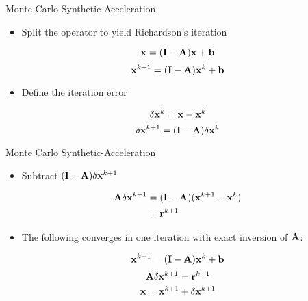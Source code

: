 \documentclass{beamer}
\begin{document}
\begin{frame}{Monte Carlo Synthetic-Acceleration}
  \begin{itemize}
  \item Split the operator to yield Richardson's iteration
  \end{itemize}

  \[
  \mathbf{x} = (\mathbf{I} - \mathbf{A})\mathbf{x} + \mathbf{b}
  \]
  \[
  \mathbf{x}^{k+1} = (\mathbf{I} - \mathbf{A})\mathbf{x}^k + \mathbf{b}
  \]

  \begin{itemize}
  \item Define the iteration error
  \end{itemize}

  \[
  \delta \mathbf{x}^k = \mathbf{x} - \mathbf{x}^k
  \]
  \[
  \delta \mathbf{x}^{k+1} = (\mathbf{I} - \mathbf{A})\delta \mathbf{x}^k
  \]

\end{frame}

\begin{frame}{Monte Carlo Synthetic-Acceleration}

  \begin{itemize}
  \item Subtract $(\mathbf{I} - \mathbf{A})\delta \mathbf{x}^{k+1}$
  \end{itemize}

  \[
  \begin{split}
    \mathbf{A}\delta \mathbf{x}^{k+1} &= (\mathbf{I} -
    \mathbf{A})(\mathbf{x}^{k+1}-\mathbf{x}^{k}) \\ &= \mathbf{r}^{k+1}
  \end{split}
  \]

  \begin{itemize}
  \item The following converges in one iteration with exact inversion
    of $\mathbf{A}$:
  \end{itemize}

  \[
  \mathbf{x}^{k+1} = (\mathbf{I} - \mathbf{A})\mathbf{x}^k + \mathbf{b}
  \]
  \[
  \mathbf{A} \delta \mathbf{x}^{k+1} = \mathbf{r}^{k+1}
  \]
  \[
  \mathbf{x} = \mathbf{x}^{k+1} + \delta \mathbf{x}^{k+1}
  \]

\end{frame}
\end{document}
